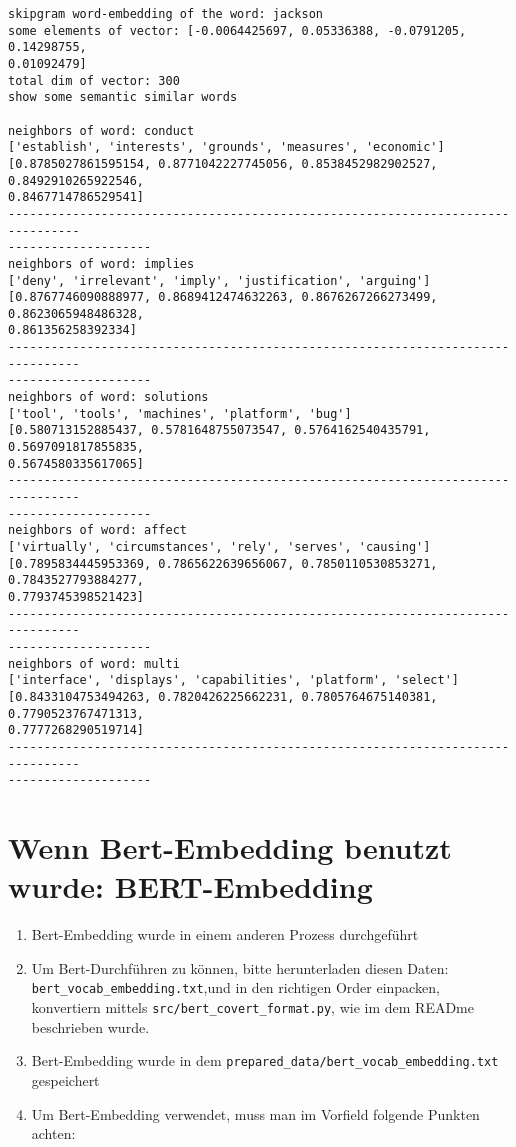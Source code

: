\documentclass[11pt]{article}
\providecommand{\tightlist}{%
      \setlength{\itemsep}{0pt}\setlength{\parskip}{0pt}}
\begin{document}
    \begin{Verbatim}[commandchars=\\\{\}]
skipgram word-embedding of the word: jackson
some elements of vector: [-0.0064425697, 0.05336388, -0.0791205, 0.14298755,
0.01092479]
total dim of vector: 300
show some semantic similar words

neighbors of word: conduct
['establish', 'interests', 'grounds', 'measures', 'economic']
[0.8785027861595154, 0.8771042227745056, 0.8538452982902527, 0.8492910265922546,
0.8467714786529541]
--------------------------------------------------------------------------------
--------------------
neighbors of word: implies
['deny', 'irrelevant', 'imply', 'justification', 'arguing']
[0.8767746090888977, 0.8689412474632263, 0.8676267266273499, 0.8623065948486328,
0.861356258392334]
--------------------------------------------------------------------------------
--------------------
neighbors of word: solutions
['tool', 'tools', 'machines', 'platform', 'bug']
[0.580713152885437, 0.5781648755073547, 0.5764162540435791, 0.5697091817855835,
0.5674580335617065]
--------------------------------------------------------------------------------
--------------------
neighbors of word: affect
['virtually', 'circumstances', 'rely', 'serves', 'causing']
[0.7895834445953369, 0.7865622639656067, 0.7850110530853271, 0.7843527793884277,
0.7793745398521423]
--------------------------------------------------------------------------------
--------------------
neighbors of word: multi
['interface', 'displays', 'capabilities', 'platform', 'select']
[0.8433104753494263, 0.7820426225662231, 0.7805764675140381, 0.7790523767471313,
0.7777268290519714]
--------------------------------------------------------------------------------
--------------------
\end{Verbatim}

    \hypertarget{wenn-bert-embedding-benutzt-wurde-bert-embedding}{%
\section{\texorpdfstring{\textbf{Wenn Bert-Embedding benutzt wurde:
BERT-Embedding}}{Wenn Bert-Embedding benutzt wurde: BERT-Embedding}}\label{wenn-bert-embedding-benutzt-wurde-bert-embedding}}

\begin{enumerate}
\def\labelenumi{\arabic{enumi}.}
\tightlist
\item
  Bert-Embedding wurde in einem anderen Prozess durchgeführt
\item
  Um Bert-Durchführen zu können, bitte herunterladen diesen Daten:
  \texttt{bert\_vocab\_embedding.txt},und in den richtigen Order
  einpacken, konvertiern mittels \texttt{src/bert\_covert\_format.py},
  wie im dem READme beschrieben wurde.
\item
  Bert-Embedding wurde in dem
  \texttt{prepared\_data/bert\_vocab\_embedding.txt} gespeichert
\item
  Um Bert-Embedding verwendet, muss man im Vorfield folgende Punkten
  achten:
\end{enumerate}
\end{document}
